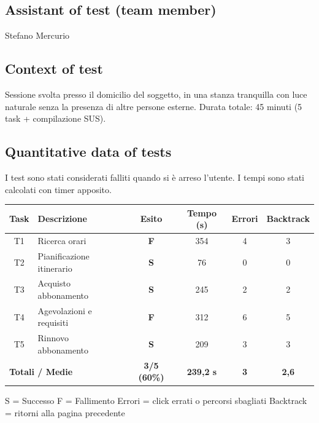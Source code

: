 \documentclass[11pt,a4paper]{article}
\begin{document}
\subsection*{Assistant of test (team member)}
\begin{tcolorbox}[colback=backgroundColor,colframe=borderColor,arc=2mm]
Stefano Mercurio
\end{tcolorbox}

\subsection*{Context of test}
\begin{tcolorbox}[colback=backgroundColor,colframe=borderColor,arc=2mm]
Sessione svolta presso il domicilio del soggetto, in una
stanza tranquilla con luce naturale senza la presenza di altre persone esterne. Durata totale: 45
minuti (5 task + compilazione SUS).
\end{tcolorbox}

\subsection*{Quantitative data of tests}
\begin{tcolorbox}[colback=backgroundColor,colframe=borderColor,arc=2mm]
I test sono stati considerati falliti quando si è arreso l'utente.
I tempi sono stati calcolati con timer apposito.
\begin{center}
\renewcommand{\arraystretch}{1.4}
\begin{tabular}{clcccc}
\toprule
\textbf{Task} & \textbf{Descrizione} &
\textbf{Esito} & \textbf{Tempo (s)} &
\textbf{Errori} & \textbf{Backtrack} \\
\midrule
T1 & Ricerca orari        & \textbf{F} & 354 & 4 & 3 \\
T2 & Pianificazione itinerario & \textbf{S} & 76 & 0 & 0 \\
T3 & Acquisto abbonamento & \textbf{S} & 245 & 2 & 2 \\
T4 & Agevolazioni e requisiti & \textbf{F} & 312 & 6 & 5 \\
T5 & Rinnovo abbonamento  & \textbf{S} & 209 & 3 & 3 \\
\midrule
\multicolumn{2}{l}{\textbf{Totali / Medie}} &
\textbf{3/5 (60\%)} & \textbf{239,2 s} &
\textbf{3} & \textbf{2,6} \\
\bottomrule
\end{tabular}
\end{center}

\vspace{0.3cm}
\small S = Successo \quad F = Fallimento \quad
Errori = click errati o percorsi sbagliati \quad
Backtrack = ritorni alla pagina precedente
\end{tcolorbox}
\end{document}
